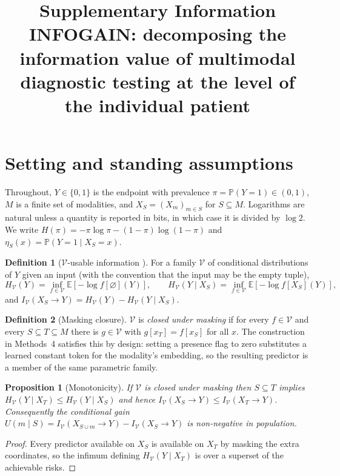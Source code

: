 \documentclass[11pt]{article}
\title{\bfseries Supplementary Information\\[2mm]
INFOGAIN: decomposing the information value of multimodal diagnostic testing
at the level of the individual patient}
\date{}
\newtheorem{proposition}{Proposition}
\theoremstyle{definition}
\newtheorem{definition}{Definition}
\theoremstyle{remark}
\newcommand{\Vc}{\mathcal{V}}
\newcommand{\IV}{I_{\Vc}}
\newcommand{\HV}{H_{\Vc}}
\newcommand{\E}{\mathbb{E}}
\newcommand{\Prob}{\mathbb{P}}
\begin{document}
\maketitle
\tableofcontents
\clearpage

\section{Setting and standing assumptions}
\label{sec:s-setting}
\label{sec:setup}

Throughout, $Y\in\{0,1\}$ is the endpoint with prevalence
$\pi=\Prob(Y=1)\in(0,1)$, $M$ is a finite set of modalities, and
$X_S=(X_m)_{m\in S}$ for $S\subseteq M$. Logarithms are natural unless a
quantity is reported in bits, in which case it is divided by $\log 2$. We write
$H(\pi)=-\pi\log\pi-(1-\pi)\log(1-\pi)$ and $\eta_S(x)=\Prob(Y=1\mid X_S=x)$.

\begin{definition}[$\Vc$-usable information \citep{xu2020vinfo}]
For a family $\Vc$ of conditional distributions of $Y$ given an input (with the
convention that the input may be the empty tuple),
\[
\HV(Y)=\inf_{f\in\Vc}\E[-\log f[\varnothing](Y)],\qquad
\HV(Y\mid X_S)=\inf_{f\in\Vc}\E[-\log f[X_S](Y)],
\]
and $\IV(X_S\to Y)=\HV(Y)-\HV(Y\mid X_S)$.
\end{definition}

\begin{definition}[Masking closure]
$\Vc$ is \emph{closed under masking} if for every $f\in\Vc$ and every
$S\subseteq T\subseteq M$ there is $g\in\Vc$ with
$g[x_T]=f[x_S]$ for all $x$. The construction in
Methods~4 satisfies this by design: setting a presence flag to zero
substitutes a learned constant token for the modality's embedding, so the
resulting predictor is a member of the same parametric family.
\end{definition}

\begin{proposition}[Monotonicity]
\label{prop:mono}
If $\Vc$ is closed under masking then $S\subseteq T$ implies
$\HV(Y\mid X_T)\le \HV(Y\mid X_S)$ and hence
$\IV(X_S\to Y)\le \IV(X_T\to Y)$. Consequently the conditional gain
$U(m\mid S)=\IV(X_{S\cup m}\to Y)-\IV(X_S\to Y)$ is non-negative in population.
\end{proposition}

\begin{proof}
Every predictor available on $X_S$ is available on $X_T$ by masking the extra
coordinates, so the infimum defining $\HV(Y\mid X_T)$ is over a superset of the
achievable risks.
\end{proof}
\end{document}
